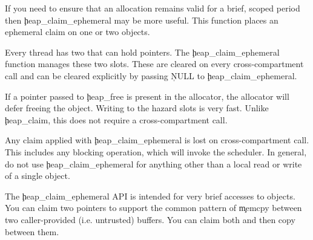 
If you need to ensure that an allocation remains valid for a brief, scoped period then \c{heap_claim_ephemeral} may be more useful.
This function places an ephemeral claim on one or two objects.


Every thread has two  that can hold pointers.
The \c{heap_claim_ephemeral} function manages these two slots.
These are cleared on every cross-compartment call and can be cleared explicitly by passing \c{NULL} to \c{heap_claim_ephemeral}.

If a pointer passed to \c{heap_free} is present in the allocator, the allocator will defer freeing the object.
Writing to the hazard slots is very fast.
Unlike \c{heap_claim}, this does not require a cross-compartment call.

\begin{caution}
	Any claim applied with \c{heap_claim_ephemeral} is lost on  cross-compartment call.
	This includes any blocking operation, which will invoke the scheduler.
	In general, do not use \c{heap_claim_ephemeral} for anything other than a local read or write of a single object.
\end{caution}

The \c{heap_claim_ephemeral} API is intended for very brief accesses to objects.
You can claim two pointers to support the common pattern of \c{memcpy} between two caller-provided (i.e. untrusted) buffers.
You can claim both and then copy between them.
